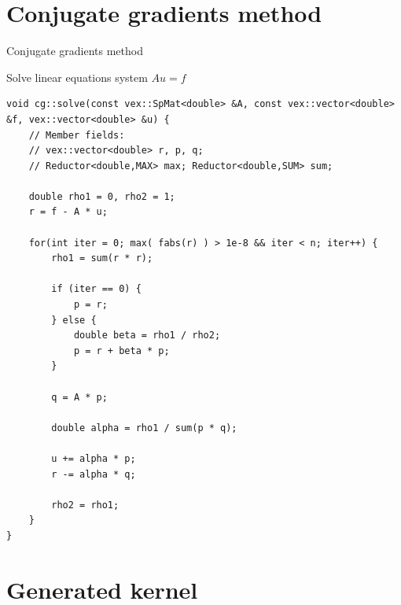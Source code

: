 \documentclass[@BEAMER_OPTIONS@]{beamer}
\begin{document}
\note{ }

\appendix

\section{Conjugate gradients method}

\begin{frame}[fragile,shrink=20]{Conjugate gradients method}
    \begin{exampleblock}{Solve linear equations system $Au = f$}
        \begin{lstlisting}
void cg::solve(const vex::SpMat<double> &A, const vex::vector<double> &f, vex::vector<double> &u) {
    // Member fields:
    // vex::vector<double> r, p, q;
    // Reductor<double,MAX> max; Reductor<double,SUM> sum;

    double rho1 = 0, rho2 = 1;
    r = f - A * u;

    for(int iter = 0; max( fabs(r) ) > 1e-8 && iter < n; iter++) {
        rho1 = sum(r * r);

        if (iter == 0) {
            p = r;
        } else {
            double beta = rho1 / rho2;
            p = r + beta * p;
        }

        q = A * p;

        double alpha = rho1 / sum(p * q);

        u += alpha * p;
        r -= alpha * q;

        rho2 = rho1;
    }
}
        \end{lstlisting}
    \end{exampleblock}
\end{frame}

\note {}

\section{Generated kernel}
\end{document}
